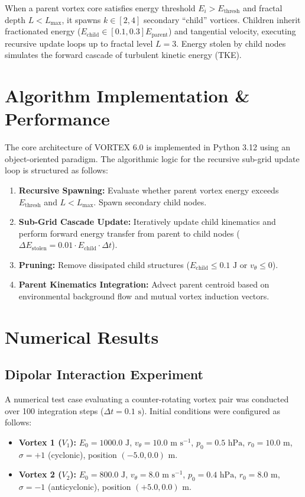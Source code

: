 \documentclass[11pt, a4paper]{article}
\begin{document}
When a parent vortex core satisfies energy threshold $E_i > E_{\text{thresh}}$ and fractal depth $L < L_{\text{max}}$, it spawns $k \in [2, 4]$ secondary ``child'' vortices. Children inherit fractionated energy ($E_{\text{child}} \in [0.1, 0.3] E_{\text{parent}}$) and tangential velocity, executing recursive update loops up to fractal level $L=3$. Energy stolen by child nodes simulates the forward cascade of turbulent kinetic energy (TKE).

\section{Algorithm Implementation \& Performance}

The core architecture of VORTEX 6.0 is implemented in Python 3.12 using an object-oriented paradigm. The algorithmic logic for the recursive sub-grid update loop is structured as follows:

\begin{enumerate}[label=\roman*.]
    \item \textbf{Recursive Spawning:} Evaluate whether parent vortex energy exceeds $E_{\text{thresh}}$ and $L < L_{\text{max}}$. Spawn secondary child nodes.
    \item \textbf{Sub-Grid Cascade Update:} Iteratively update child kinematics and perform forward energy transfer from parent to child nodes ($\Delta E_{\text{stolen}} = 0.01 \cdot E_{\text{child}} \cdot \Delta t$).
    \item \textbf{Pruning:} Remove dissipated child structures ($E_{\text{child}} \le 0.1\text{ J}$ or $v_\theta \le 0$).
    \item \textbf{Parent Kinematics Integration:} Advect parent centroid based on environmental background flow and mutual vortex induction vectors.
\end{enumerate}

\section{Numerical Results}

\subsection{Dipolar Interaction Experiment}

A numerical test case evaluating a counter-rotating vortex pair was conducted over 100 integration steps ($\Delta t = 0.1\text{ s}$). Initial conditions were configured as follows:
\begin{itemize}[label=--]
    \item \textbf{Vortex 1 ($V_1$):} $E_0 = 1000.0\text{ J}$, $v_\theta = 10.0\text{ m s}^{-1}$, $p_0 = 0.5\text{ hPa}$, $r_0 = 10.0\text{ m}$, $\sigma = +1$ (cyclonic), position $(-5.0, 0.0)\text{ m}$.
    \item \textbf{Vortex 2 ($V_2$):} $E_0 = 800.0\text{ J}$, $v_\theta = 8.0\text{ m s}^{-1}$, $p_0 = 0.4\text{ hPa}$, $r_0 = 8.0\text{ m}$, $\sigma = -1$ (anticyclonic), position $(+5.0, 0.0)\text{ m}$.
\end{itemize}
\end{document}
